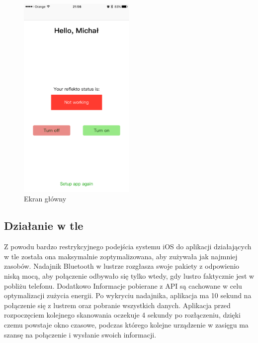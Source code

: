 \documentclass[a4paper,11pt]{article}
\begin{document}
\begin{figure}[H]
	\includegraphics[width=0.5\textwidth,center]{ios-screens/main.png}
	\caption {Ekran główny}
	\label{main_ios}
\end{figure}

\subsection{Działanie w tle}
Z powodu bardzo restrykcyjnego podejścia systemu iOS do aplikacji działających w tle została ona maksymalnie zoptymalizowana, aby zużywała jak najmniej zasobów. Nadajnik Bluetooth w lustrze rozgłasza swoje pakiety z odpowienio niską mocą, aby połączenie odbywało się tylko wtedy, gdy lustro faktycznie jest w pobliżu telefonu. Dodatkowo Informacje pobierane z API są cachowane w celu optymalizacji zużycia energii. Po wykryciu nadajnika, aplikacja ma 10 sekund na połączenie się z lustrem oraz pobranie wszystkich danych. Aplikacja przed rozpoczęciem kolejnego skanowania oczekuje 4 sekundy po rozłączeniu, dzięki czemu powstaje okno czasowe, podczas którego kolejne urządzenie w zasięgu ma szansę na połączenie i wysłanie swoich informacji.
\end{document}
